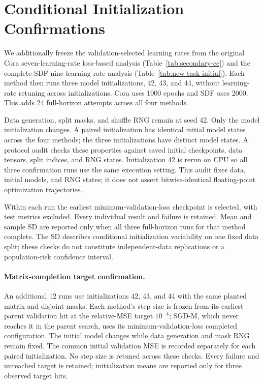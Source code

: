 \section{Conditional Initialization Confirmations}
\label{app:initialization-confirmation}
We additionally freeze the validation-selected learning rates from
the original Cora seven-learning-rate loss-based analysis
(Table~\ref{tab:secondary-ce}) and the complete SDF nine-learning-rate
analysis (Table~\ref{tab:new-task-initial}). Each method then runs
three model initializations, 42, 43, and 44, without learning-rate
retuning across initializations. Cora uses 1000 epochs and SDF uses
2000. This adds 24 full-horizon attempts across all four methods.

Data generation, split masks, and shuffle RNG remain at seed 42.
Only the model initialization changes. A paired initialization has
identical initial model states across the four methods; the three
initializations have distinct model states. A protocol audit checks
these properties against saved initial checkpoints, data tensors,
split indices, and RNG states. Initialization 42 is rerun on CPU so
all three confirmation runs use the same execution setting.
This audit fixes data, initial models, and RNG states; it does not
assert bitwise-identical floating-point optimization trajectories.

Within each run the earliest minimum-validation-loss checkpoint is
selected, with test metrics excluded. Every individual result and
failure is retained. Mean and sample SD are reported only when all
three full-horizon runs for that method complete. The SD describes
conditional initialization variability on one fixed data split;
these checks do not constitute independent-data replications or
a population-risk confidence interval.



\paragraph{Matrix-completion target confirmation.}
An additional 12 runs use initializations 42, 43, and 44 with the
same planted matrix and disjoint masks. Each method's step size is
frozen from its earliest parent validation hit at the relative-MSE
target $10^{-4}$; SGD-M, which never reaches it in the parent search,
uses its minimum-validation-loss completed configuration.
The initial model changes while data generation and mask RNG remain
fixed. The common initial validation MSE is recorded separately for
each paired initialization. No step size is retuned across these
checks. Every failure and unreached target is retained; initialization
means are reported only for three observed target hits.

\FloatBarrier

